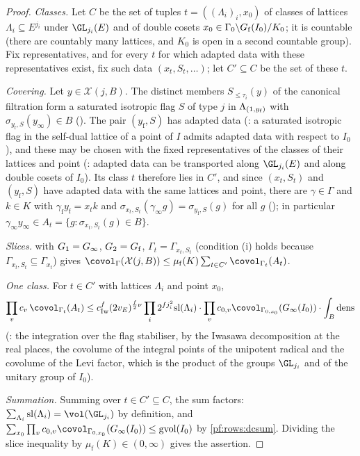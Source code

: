 \begin{proof}
\emph{Classes.} Let $C$ be the set of tuples $t=((\Lambda_i)_i,x_0)$ of classes of lattices $\Lambda_i\subseteq E^{j_i}$ under
$\GL_{j_i}(E)$ and of double cosets $x_0\in\Gamma_0\backslash G_{\mathrm f}(I_0)/K_0$; it is countable (there are countably many lattices,
and $K_0$ is open in a second countable group). Fix representatives, and for every $t$ for which adapted data with these
representatives exist, fix such data $(x_t,S_t,\dots)$; let $C'\subseteq C$ be the set of these $t$.

\emph{Covering.} Let $y\in\mathcal X(j,B)$. The distinct members $S_{\le\tau_i}(y)$ of the canonical filtration form a saturated
isotropic flag $S$ of type $j$ in $\Lambda_{(1,y_{\mathrm f})}$ with $\sigma_{y_{\mathrm f},S}(y_\infty)\in B$
(). The pair $(y_{\mathrm f},S)$ has adapted data
(: a saturated isotropic flag in the self-dual lattice of
a point of $I$ admits adapted data with respect to $I_0$), and these may be chosen with the fixed representatives of the classes
of their lattices and point (: adapted data can be transported
along $\GL_{j_i}(E)$ and along double cosets of $I_0$). Its class $t$ therefore lies in $C'$, and since $(x_t,S_t)$ and
$(y_{\mathrm f},S)$ have adapted data with the same lattices and point, there are $\gamma\in\Gamma$ and $k\in K$ with
$\gamma_{\mathrm f}y_{\mathrm f}=x_tk$ and $\sigma_{x_t,S_t}(\gamma_\infty g)=\sigma_{y_{\mathrm f},S}(g)$ for all $g$
(); in particular $\gamma_\infty y_\infty\in
A_t=\{g:\sigma_{x_t,S_t}(g)\in B\}$.

\emph{Slices.}  with $G_1=G_\infty$, $G_2=G_{\mathrm f}$, $\Gamma_t=\Gamma_{x_t,S_t}$ (condition (i) holds because
$\Gamma_{x_t,S_t}\subseteq\Gamma_{x_t}$) gives $\covol_\Gamma(\mathcal X(j,B))\le\mu_{\mathrm f}(K)\sum_{t\in C'}\covol_{\Gamma_t}(A_t)$.

\emph{One class.} For $t\in C'$ with lattices $\Lambda_i$ and point $x_0$,
\[
\prod_vc_v\,\covol_{\Gamma_t}(A_t)\le c_{\mathrm{Iw}}^f(2v_E)^{\frac f2\rowsdimN}\prod_i2^{fj_i^2}\mathrm{sl}(\Lambda_i)\cdot
\prod_vc_{0,v}\covol_{\Gamma_{0,x_0}}(\rowsGinf(I_0))\cdot\int_B\rowsdens
\]
(: the integration over the flag stabiliser, by the
Iwasawa decomposition at the real places, the covolume of the integral points of the unipotent radical and the covolume of
the Levi factor, which is the product of the groups $\GL_{j_i}$ and of the unitary group of $I_0$).

\emph{Summation.} Summing over $t\in C'\subseteq C$, the sum factors: $\sum_{\Lambda_i}\mathrm{sl}(\Lambda_i)=\vol(\GL_{j_i})$ by
definition, and $\sum_{x_0}\prod_vc_{0,v}\covol_{\Gamma_{0,x_0}}(\rowsGinf(I_0))\le\rowsgv(I_0)$ by \cref{pf:rows:dcsum}. Dividing the
slice inequality by $\mu_{\mathrm f}(K)\in(0,\infty)$ gives the assertion.
\end{proof}

